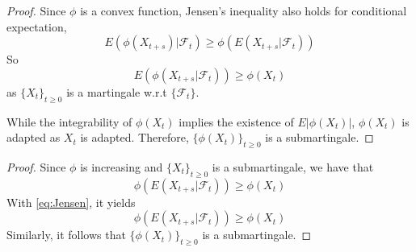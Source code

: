 \documentclass{homework}
\begin{document}
    \problem
    \begin{subproblem}
        \item
        \begin{proof}
            Since $\phi$ is a convex function, Jensen's inequality
            also holds for conditional expectation,
            \begin{equation}
                \label{eq:Jensen}
                E(\phi(X_{t+s})|\mathcal F_t)
                \geq\phi(E(X_{t+s}|\mathcal F_t))
            \end{equation}
            So
            \[E(\phi(X_{t+s}|\mathcal F_t))\geq\phi(X_t)\]
            as $\{X_t\}_{t\geq 0}$ is a martingale w.r.t $\{\mathcal F_t\}$.

            While the integrability of $\phi(X_t)$ implies the existence of
            $E|\phi(X_t)|$, $\phi(X_t)$ is adapted as $X_t$ is adapted.
            Therefore, $\{\phi(X_t)\}_{t\geq 0}$ is a submartingale.
        \end{proof}

        \item
        \begin{proof}
            Since $\phi$ is increasing and $\{X_t\}_{t\geq 0}$ is a
            submartingale, we have that
            \[\phi(E(X_{t+s}|\mathcal F_t))\geq\phi(X_t)\]
            With \cref{eq:Jensen}, it yields
            \[\phi(E(X_{t+s}|\mathcal F_t))\geq\phi(X_t)\]
            Similarly, it follows that $\{\phi(X_t)\}_{t\geq 0}$
            is a submartingale.
        \end{proof}
    \end{subproblem}
\end{document}
